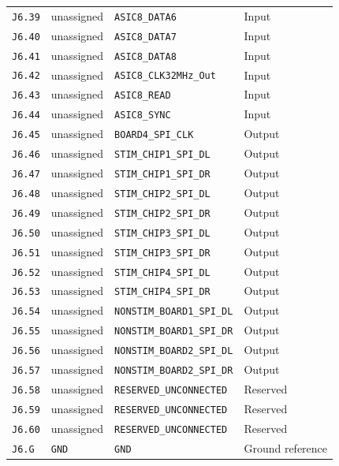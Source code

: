 \documentclass[11pt,a4paper]{article}
\begin{document}
\begin{longtable}{@{}P{19mm}P{36mm}P{78mm}P{33mm}@{}}
\nolinkurl{J6.39} & \textcolor{muted}{unassigned} & \nolinkurl{ASIC8_DATA6} & Input \\
\nolinkurl{J6.40} & \textcolor{muted}{unassigned} & \nolinkurl{ASIC8_DATA7} & Input \\
\nolinkurl{J6.41} & \textcolor{muted}{unassigned} & \nolinkurl{ASIC8_DATA8} & Input \\
\nolinkurl{J6.42} & \textcolor{muted}{unassigned} & \nolinkurl{ASIC8_CLK32MHz_Out} & Input \\
\nolinkurl{J6.43} & \textcolor{muted}{unassigned} & \nolinkurl{ASIC8_READ} & Input \\
\nolinkurl{J6.44} & \textcolor{muted}{unassigned} & \nolinkurl{ASIC8_SYNC} & Input \\
\nolinkurl{J6.45} & \textcolor{muted}{unassigned} & \nolinkurl{BOARD4_SPI_CLK} & Output \\
\nolinkurl{J6.46} & \textcolor{muted}{unassigned} & \nolinkurl{STIM_CHIP1_SPI_DL} & Output \\
\nolinkurl{J6.47} & \textcolor{muted}{unassigned} & \nolinkurl{STIM_CHIP1_SPI_DR} & Output \\
\nolinkurl{J6.48} & \textcolor{muted}{unassigned} & \nolinkurl{STIM_CHIP2_SPI_DL} & Output \\
\nolinkurl{J6.49} & \textcolor{muted}{unassigned} & \nolinkurl{STIM_CHIP2_SPI_DR} & Output \\
\nolinkurl{J6.50} & \textcolor{muted}{unassigned} & \nolinkurl{STIM_CHIP3_SPI_DL} & Output \\
\nolinkurl{J6.51} & \textcolor{muted}{unassigned} & \nolinkurl{STIM_CHIP3_SPI_DR} & Output \\
\nolinkurl{J6.52} & \textcolor{muted}{unassigned} & \nolinkurl{STIM_CHIP4_SPI_DL} & Output \\
\nolinkurl{J6.53} & \textcolor{muted}{unassigned} & \nolinkurl{STIM_CHIP4_SPI_DR} & Output \\
\nolinkurl{J6.54} & \textcolor{muted}{unassigned} & \nolinkurl{NONSTIM_BOARD1_SPI_DL} & Output \\
\nolinkurl{J6.55} & \textcolor{muted}{unassigned} & \nolinkurl{NONSTIM_BOARD1_SPI_DR} & Output \\
\nolinkurl{J6.56} & \textcolor{muted}{unassigned} & \nolinkurl{NONSTIM_BOARD2_SPI_DL} & Output \\
\nolinkurl{J6.57} & \textcolor{muted}{unassigned} & \nolinkurl{NONSTIM_BOARD2_SPI_DR} & Output \\
\nolinkurl{J6.58} & \textcolor{muted}{unassigned} & \nolinkurl{RESERVED_UNCONNECTED} & Reserved \\
\nolinkurl{J6.59} & \textcolor{muted}{unassigned} & \nolinkurl{RESERVED_UNCONNECTED} & Reserved \\
\nolinkurl{J6.60} & \textcolor{muted}{unassigned} & \nolinkurl{RESERVED_UNCONNECTED} & Reserved \\
\nolinkurl{J6.G} & \nolinkurl{GND} & \nolinkurl{GND} & Ground reference \\
\end{longtable}\endgroup
\end{document}

